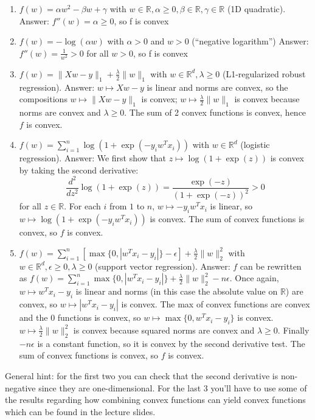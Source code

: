 \documentclass{article}
\def\gre#1{{\color{gre}#1}}
\def\norm#1{\|#1\|}
\def\ans#1{\gre{Answer: #1}}{}
\def\R{\mathbb{R}}
\def\enum#1{\begin{enumerate}#1\end{enumerate}}
\begin{document}
\enum{
\item $f(w) = \alpha w^2 - \beta w + \gamma$ with $w \in \R, \alpha \geq 0, \beta \in \R, \gamma \in \R$ (1D quadratic).
\ans{$f''(w) = \alpha \geq 0$, so f is convex}
\item $f(w) = -\log(\alpha w) $ with $\alpha > 0$ and $w > 0$ (``negative logarithm'')
\ans{$f''(w) = \frac{1}{w^2} > 0$ for all $ w > 0$, so f is convex }
\item $f(w) = \norm{Xw-y}_1 + \frac{\lambda}{2}\norm{w}_1$ with $w \in \R^d, \lambda \geq 0$ (L1-regularized robust regression).
\ans{$w \longmapsto Xw - y$ is linear and norms are convex, so the compositions $w \longmapsto \norm{Xw - y}_1$ is convex; $w \longmapsto \frac{\lambda}{2} \norm{w}_1$ is convex because norms are convex and $\lambda \geq 0$. The sum of 2 convex functions is convex, hence $f$ is convex. }
\item $f(w) = \sum_{i=1}^n \log(1+\exp(-y_iw^Tx_i)) $ with $w \in \R^d$ (logistic regression).
\ans{We first show that $z \longmapsto \log(1 + \exp(z))$ is convex by taking the second derivative: $$\frac{d^2}{d z^2}\log(1 + \exp(z)) = \frac{\exp(-z)}{(1 + \exp(-z))^2} > 0$$ for all $z \in \R$. For each $i$ from $1$ to $n$, $w \longmapsto -y_i w^{T} x_i$ is linear, so $w \longmapsto \log(1+\exp(-y_iw^Tx_i))$ is convex. The sum of convex functions is convex, so $f$ is convex.}
\item $f(w) = \sum_{i=1}^n[\max\{0,|w^Tx_i - y_i|\} - \epsilon] + \frac{\lambda}{2}\norm{w}_2^2$  with $w \in \R^d, \epsilon \geq 0, \lambda \geq 0$ (support vector regression).
\ans{$f$ can be rewritten as $f(w) = \sum_{i=1}^n\max\{0,|w^Tx_i - y_i|\} + \frac{\lambda}{2}\norm{w}_2^2 - n \epsilon$. Once again, $w \longmapsto w^{T} x_i - y_i$ is linear and norms (in this case the absolute value on $\R$) are convex, so $w \longmapsto |w^{T} x_i - y_i|$ is convex. The max of convex functions are convex and the $0$ functions is convex, so $w \longmapsto \max\{0, w^{T} x_i - y_i\}$ is convex. $w \longmapsto \frac{\lambda}{2}\norm{w}_2^2$ is convex because squared norms are convex and $\lambda \geq 0$. Finally $- n \epsilon$ is a constant function, so it is convex by the second derivative test. The sum of convex functions is convex, so $f$ is convex.}
}

General hint: for the first two you can check that the second derivative is non-negative since they are one-dimensional. For the last 3 you'll have to use some of the results regarding how combining convex functions can yield convex functions which can be found in the lecture slides.
\end{document}
